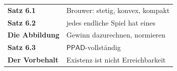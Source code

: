 \begin{merksatz}
\begin{center}
\renewcommand{\arraystretch}{1.5}
\begin{tabular}{@{}P{3.0cm}P{5.6cm}@{}}
\toprule
\textbf{Satz 6.1} & Brouwer: stetig, konvex, kompakt\\
\textbf{Satz 6.2} & jedes endliche Spiel hat eines\\
\textbf{Die Abbildung} & Gewinn dazurechnen, normieren\\
\textbf{Satz 6.3} & $\mathsf{PPAD}$-vollständig\\
\textbf{Der Vorbehalt} & Existenz ist nicht Erreichbarkeit\\
\bottomrule
\end{tabular}
\end{center}

\begin{center}
\begin{minipage}{0.88\textwidth}
\end{minipage}
\end{center}
\end{merksatz}

